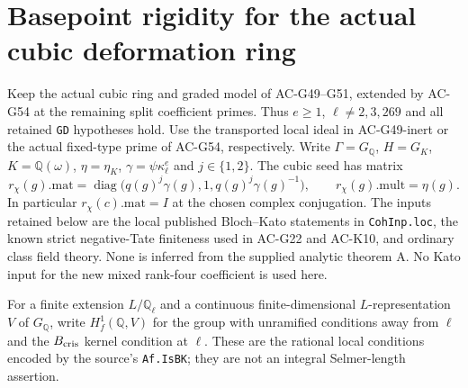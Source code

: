 \section{Basepoint rigidity for the actual cubic deformation ring}
\label{sec:cubic-basepoint-rigidity}

Keep the actual cubic ring and graded model of AC-G49--G51,
extended by AC-G54 at the remaining split coefficient primes.
Thus $e\geq1$, $\ell\ne2,3,269$ and all retained
\texttt{GD} hypotheses hold.  Use the transported local
ideal in AC-G49-inert or the actual fixed-type prime of
AC-G54, respectively.  Write $\Gamma=G_{\mathbb Q}$,
$H=G_K$, $K=\mathbb Q(\omega)$, $\eta=\eta_K$,
$\gamma=\psi\kappa_\ell^e$ and $j\in\{1,2\}$.
The cubic seed has matrix
\[
 r_\chi(g).\mathrm{mat}
   =\operatorname{diag}\bigl(q(g)^j\gamma(g),1,
                             q(g)^j\gamma(g)^{-1}\bigr),
 \qquad r_\chi(g).\mathrm{mult}=\eta(g).
                                                               \tag{G53.1}
\]
In particular $r_\chi(c).\mathrm{mat}=I$ at the chosen
complex conjugation.  The inputs retained below are the local
published Bloch--Kato statements in \texttt{CohInp.loc},
the known strict negative-Tate finiteness used in AC-G22
and AC-K10, and ordinary class field theory.  None is inferred
from the supplied analytic theorem A.  No Kato input for the
new mixed rank-four coefficient is used here.

For a finite extension $L/\mathbb Q_\ell$ and a continuous
finite-dimensional $L$-representation $V$ of $G_{\mathbb Q}$,
write $H^1_f(\mathbb Q,V)$ for the group with unramified
conditions away from $\ell$ and the $B_{\rm cris}$ kernel
condition at $\ell$.  These are the rational local conditions
encoded by the source's \texttt{Af.IsBK}; they are not an
integral Selmer-length assertion.

